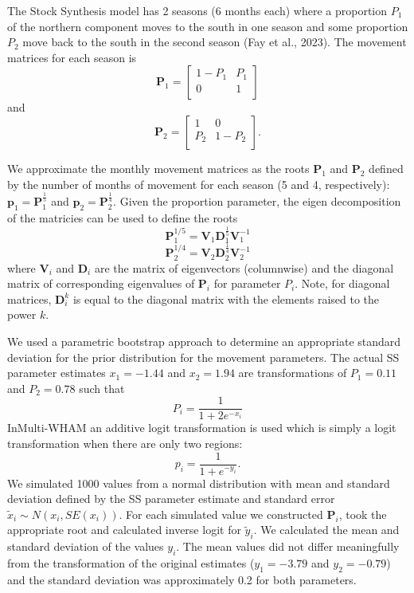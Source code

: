 \documentclass[
]{article}
\begin{document}
The Stock Synthesis model has 2 seasons (6 months each) where a proportion \(P_1\) of the northern component moves to the south in one season and some proportion \(P_2\) move back to the south in the second season (Fay et al., 2023). The movement matrices for each season is
\begin{equation*}
\mathbf{P}_{1} = 
  \begin{bmatrix}
     1-P_1 & P_1 \\
     0 & 1 \\
  \end{bmatrix}
\end{equation*}
and
\begin{equation*}
\mathbf{P}_{2} = 
  \begin{bmatrix}
     1 &  0 \\
     P_2 & 1-P_2 \\
  \end{bmatrix}.
\end{equation*}

We approximate the monthly movement matrices as the roots \(\mathbf{P}_1\) and \(\mathbf{P}_2\) defined by the number of months of movement for each season (5 and 4, respectively): \(\mathbf{p}_1 = \mathbf{P}_1^{\frac{1}{5}}\) and \(\mathbf{p}_2 = \mathbf{P}_2^{\frac{1}{4}}\). Given the proportion parameter, the eigen decomposition of the matricies can be used to define the roots
\[  \mathbf{P}_1^{1/5} = \mathbf{V}_1 \mathbf{D}_1^{\frac{1}{5}} \mathbf{V}_1^{-1}\]
\[  \mathbf{P}_2^{1/4} = \mathbf{V}_2 \mathbf{D}_2^{\frac{1}{4}} \mathbf{V}_2^{-1}\]
where \(\mathbf{V}_i\) and \(\mathbf{D}_i\) are the matrix of eigenvectors (columnwise) and the diagonal matrix of corresponding eigenvalues of \(\mathbf{P}_i\) for parameter \(P_i\). Note, for diagonal matrices, \(\mathbf{D}_i^k\) is equal to the diagonal matrix with the elements raised to the power \(k\).

We used a parametric bootstrap approach to determine an appropriate standard deviation for the prior distribution for the movement parameters.
The actual SS parameter estimates \(x_1=-1.44\) and \(x_2=1.94\) are transformations of \(P_1=0.11\) and \(P_2=0.78\) such that
\[
P_i = \frac{1}{1 + 2e^{-x_i}}
\]
InMulti-WHAM an additive logit transformation is used which is simply a logit transformation when there are only two regions:
\[
p_i = \frac{1}{1+e^{-y_i}}.
\]
We simulated 1000 values from a normal distribution with mean and standard deviation defined by the SS parameter estimate and standard error \(\tilde x_i \sim N(x_i, SE(x_i))\). For each simulated value we constructed \(\mathbf{P}_i\), took the appropriate root and calculated inverse logit for \(\tilde y_i\). We calculated the mean and standard deviation of the values \(y_i\). The mean values did not differ meaningfully from the transformation of the original estimates (\(y_1 = -3.79\) and \(y_2 = -0.79\)) and the standard deviation was approximately 0.2 for both parameters.
\end{document}
